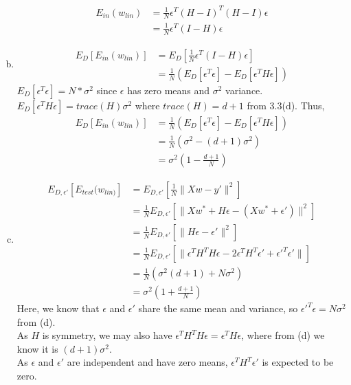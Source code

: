 \documentclass{article}
\def\math#1{$#1$}
\begin{document}
\begin{enumerate}[a)]
\begin{equation}
\begin{split}
                E_{in}(w_{lin}) &= \frac{1}{N} \epsilon^T(H - I)^T(H - I)\epsilon \\
                &= \frac{1}{N} \epsilon^T(I - H)\epsilon
            \end{split}
        \end{equation}
    \item  
        \begin{equation}
            \begin{split}
                E_D[E_{in}(w_{lin})] &= E_D[\frac{1}{N} \epsilon^T(I - H)\epsilon]\\
                &= \frac{1}{N} (E_D[\epsilon^T\epsilon] - E_D[\epsilon^TH\epsilon])
            \end{split}
        \end{equation}
        \math{E_D[\epsilon^T\epsilon] = N * \sigma^2} since \math{\epsilon} has zero means and \math{\sigma^2} variance. \math{E_D[\epsilon^TH\epsilon] = trace(H)\sigma^2} where \math{trace(H) = d + 1} from 3.3(d). Thus, %
        \begin{equation}
            \begin{split}
                E_D[E_{in}(w_{lin})] &= \frac{1}{N} (E_D[\epsilon^T\epsilon] - E_D[\epsilon^TH\epsilon]) \\
                &=\frac{1}{N} (\sigma^2 - (d + 1)\sigma^2) \\
                &= \sigma^2 (1 - \frac{d + 1}{N})
            \end{split}
        \end{equation}
    \item 
        \begin{equation}
            \begin{split}
                E_{D, \epsilon'}[E_{test}(w_{lin)}] &= E_{D, \epsilon'}[\frac{1}{N}\|Xw - y'\|^2] \\
                &= \frac{1}{N} E_{D, \epsilon'}[\|Xw^* + H\epsilon - (Xw^* + \epsilon')\|^2] \\
                &= \frac{1}{N} E_{D, \epsilon'}[\|H\epsilon - \epsilon'\|^2] \\
                &= \frac{1}{N} E_{D, \epsilon'}[\|\epsilon^TH^TH\epsilon - 2\epsilon^TH^T\epsilon' + \epsilon'^T\epsilon'\|] \\ 
                &= \frac{1}{N} (\sigma^2(d + 1) + N\sigma^2) \\
                &= \sigma^2(1 + \frac{d+1}{N})
            \end{split}
        \end{equation}
    Here, we know that \math{\epsilon} and \math{\epsilon'} share the same mean and variance, so \math{\epsilon'^T\epsilon = N\sigma^2} from (d).\\ As \math{H} is symmetry, we may also have \math{\epsilon^TH^TH\epsilon = \epsilon^TH\epsilon}, where from (d) we know it is \math{(d + 1)\sigma^2}. \\
    As \math{\epsilon} and \math{\epsilon'} are independent and have zero means, \math{\epsilon^TH^T\epsilon'} is expected to be zero.
\end{enumerate}
\end{document}
